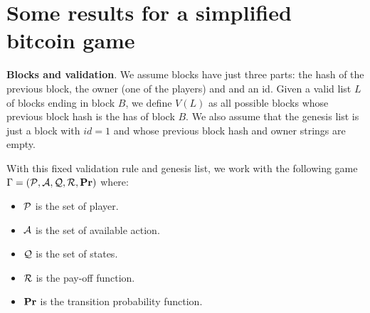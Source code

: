 \documentclass{article}
\begin{document}
%
%
%
%

\section{Some results for a simplified bitcoin game}

\medskip
\noindent
\textbf{Blocks and validation}. We assume blocks have just three parts: the hash of the previous block, the owner (one of the players) and 
and an id. Given a valid list $L$ of blocks ending in block $B$, we define $V(L)$ as all possible blocks whose previous block hash is 
the has of block $B$. We also assume that the genesis list is just a block with $id = 1$ and 
whose previous block hash and owner strings are empty. 

With this fixed validation rule and genesis list, we work with the following game $\Gamma = (\mathcal{P},\mathcal{A},\mathcal{Q},\mathcal{R},\mathbf{Pr})$ where:
\begin{itemize}
	\item $\mathcal{P}$ is the set of player.
	\item $\mathcal{A}$ is the set of available action.
	\item $\mathcal{Q}$ is the set of states.
	\item $\mathcal{R}$ is the pay-off function.
	\item $\mathbf{Pr}$ is the transition probability function.
\end{itemize} 
\end{document}
